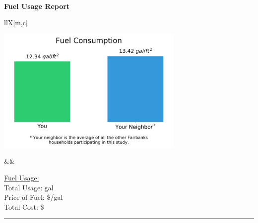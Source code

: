 \documentclass[12pt,a4paper]{article}
\begin{document}
\begin{center}
\textbf{\Huge{\\{\reportmonth} {\reportyear} Fuel Usage Report}}
\end{center}

\begin{center}
\end{center}

\vspace{12pt}

\begin{tabu}[c]{llX[m,c]}

\begin{minipage}{4in}
\includegraphics[height = 2.375in]{monthly_fuel_usage.png}
\end{minipage}

 && 

\begin{minipage}{\linewidth}
\underline{{\reportmonth} {\reportyear} Fuel Usage:}\\

Total Usage: {\totalusage} gal\\

Price of Fuel: \${\fuelprice}/gal\\

Total Cost: \${\totalcost}\\
\end{minipage}


\end{tabu}

\rule{\textwidth}{1pt}
\newline
\end{document}
